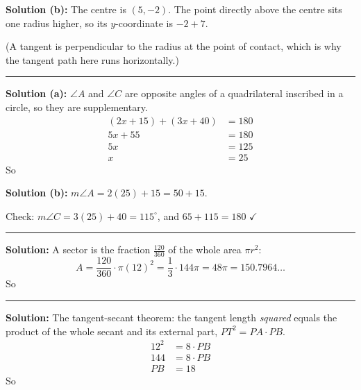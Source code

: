 \documentclass[12pt]{article}
\begin{document}
\textbf{Solution (b):} The centre is $(5, -2)$. The point directly above the centre sits one radius higher, so its $y$-coordinate is $-2 + 7$. 

(A tangent is perpendicular to the radius at the point of contact, which is why the tangent path here runs horizontally.)

\vspace{0.2cm}\noindent\rule{\linewidth}{0.2pt}


\textbf{Solution (a):} $\angle A$ and $\angle C$ are opposite angles of a quadrilateral inscribed in a circle, so they are supplementary.
\begin{align*}
  (2x + 15) + (3x + 40) &= 180 \\
  5x + 55 &= 180 \\
  5x &= 125 \\
  x &= 25
\end{align*}
So 

\textbf{Solution (b):} $m\angle A = 2(25) + 15 = 50 + 15$. 

Check: $m\angle C = 3(25) + 40 = 115^\circ$, and $65 + 115 = 180$ $\checkmark$

\vspace{0.2cm}\noindent\rule{\linewidth}{0.2pt}


\textbf{Solution:} A sector is the fraction $\frac{120}{360}$ of the whole area $\pi r^2$:
\[ A = \frac{120}{360}\cdot \pi (12)^2 = \frac{1}{3}\cdot 144\pi = 48\pi = 150.7964\ldots \]
So 

\vspace{0.2cm}\noindent\rule{\linewidth}{0.2pt}


\textbf{Solution:} The tangent-secant theorem: the tangent length \emph{squared} equals the product of the whole secant and its external part, $PT^2 = PA \cdot PB$.
\begin{align*}
  12^2 &= 8 \cdot PB \\
  144 &= 8 \cdot PB \\
  PB &= 18
\end{align*}
So 
\end{document}
